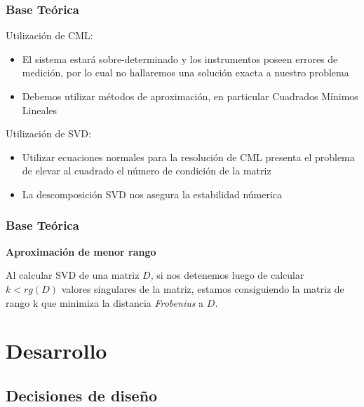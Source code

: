 \documentclass{beamer}
\begin{document}
\begin{frame}
\frametitle{Base Teórica}

Utilización de CML:
\begin{itemize}
	\item El sistema estará sobre-determinado y los instrumentos poseen errores de medición, por lo cual no hallaremos una solución exacta a nuestro problema
	\item Debemos utilizar métodos de aproximación, en particular Cuadrados Mínimos Lineales
\end{itemize}
Utilización de SVD:
\begin{itemize}
	\item Utilizar ecuaciones normales para la resolución de CML presenta el problema de elevar al cuadrado el número de condición de la matriz
	\item La descomposición SVD nos asegura la estabilidad númerica 
\end{itemize}

\end{frame}


\begin{frame}
\frametitle{Base Teórica}

	\textbf{Aproximación de menor rango}

	Al calcular SVD de una matriz $D$, si nos detenemos luego de calcular $k < rg(D)$ valores singulares de la matriz,
	estamos consiguiendo la matriz de rango k que minimiza la distancia \textit{Frobenius} a $D$.

\end{frame}

\section{Desarrollo}
\subsection{Decisiones de diseño}
\end{document}
